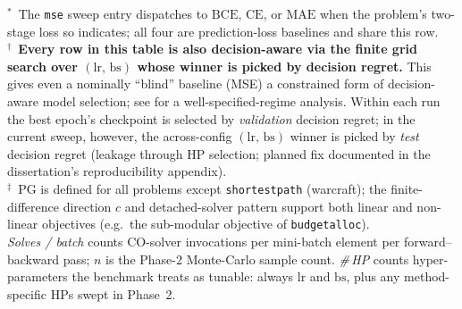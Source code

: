 \begin{table}[p]
    \vspace{0.5em}
    \begin{flushleft}
    \scriptsize
    $^{\ast}$~The \texttt{mse} sweep entry dispatches to $\mathrm{BCE}$,
    $\mathrm{CE}$, or $\mathrm{MAE}$ when the problem's two-stage loss so
    indicates; all four are prediction-loss baselines and share this row.\\[2pt]
    $^{\dagger}$~\textbf{Every row in this table is also decision-aware
    via the finite grid search over $(\mathrm{lr},\,\mathrm{bs})$ whose
    winner is picked by decision regret.} This gives even a
    nominally ``blind'' baseline (MSE) a constrained form of
    decision-aware model selection; see \citet{elmachtoub2025misspec}
    for a well-specified-regime analysis.  Within each run the best
    epoch's checkpoint is selected by \emph{validation} decision regret;
    in the current sweep, however, the across-config
    $(\mathrm{lr},\,\mathrm{bs})$ winner is picked by \emph{test}
    decision regret (leakage through HP selection; planned fix
    documented in the dissertation's reproducibility appendix).\\[2pt]
    $^{\ddagger}$~PG is defined for all problems except
    \texttt{shortestpath} (warcraft); the finite-difference direction $c$
    and detached-solver pattern support both linear and non-linear
    objectives (e.g.\ the sub-modular objective of \texttt{budgetalloc}).\\[2pt]
    \textit{Solves / batch} counts CO-solver invocations per mini-batch
    element per forward--backward pass; $n$ is the Phase-2 Monte-Carlo
    sample count.  \textit{\#\,HP} counts hyper-parameters the benchmark
    treats as tunable: always $\mathrm{lr}$ and $\mathrm{bs}$, plus any
    method-specific HPs swept in Phase~2.
    \end{flushleft}
\end{table}

%
